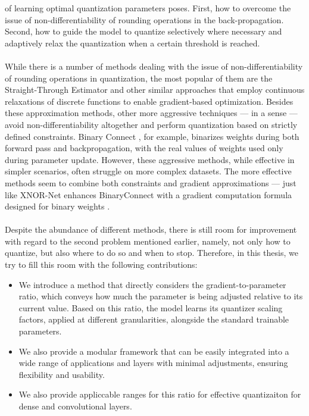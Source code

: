 of learning optimal quantization parameters poses. First, how to overcome the issue 
of non-differentiability of rounding operations in the back-propagation. 
Second, how to guide the model to quantize selectively where necessary
and adaptively relax the quantization when a certain threshold is reached. 
\\
\\
While there is a number of methods dealing with the issue of non-differentiability of rounding operations
in quantization, the most popular of them are the Straight-Through Estimator and other similar approaches 
that employ continuous relaxations of discrete functions to enable gradient-based optimization. 
Besides these approximation methods, other more aggressive techniques — in a sense — avoid 
non-differentiability altogether and perform quantization based on strictly defined constraints. 
Binary Connect \cite{courbariaux2015binaryconnect}, for example, binarizes weights during both forward pass and backpropagation, 
with the real values of weights used only during parameter update. 
However, these aggressive methods, while effective in simpler scenarios, 
often struggle on more complex datasets. The more effective methods seem to combine both constraints 
and gradient approximations — just like XNOR-Net enhances BinaryConnect with a 
gradient computation formula designed for binary weights \cite{rastegari2016xnor}. 
\\
\\
Despite the abundance of different methods, there is still room for improvement with regard to the second problem mentioned earlier,
namely, not only how to quantize, but also where to do so and when to stop.
Therefore, in this thesis, we try to fill this room with the following contributions:
\begin{itemize}
    \item We introduce a method that directly considers the gradient-to-parameter ratio,
    which conveys how much the parameter is being adjusted relative to its current value.
    Based on this ratio, the model learns its quantizer scaling factors, applied at different granularities,
    alongside the standard trainable parameters.
    \item We also provide a modular framework that can be easily integrated into a wide range of applications and layers
    with minimal adjustments, ensuring flexibility and usability.
    \item We also provide appliccable ranges for this ratio for effective quantizaiton for dense and convolutional layers.
\end{itemize}
 